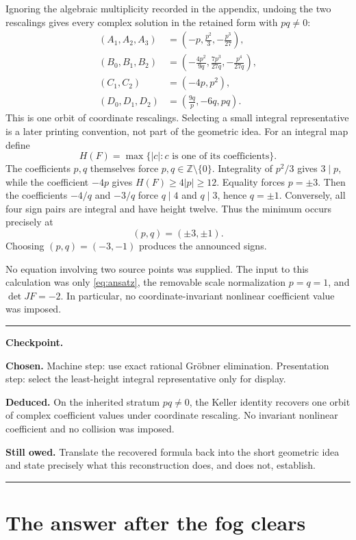 \documentclass[11pt,a4paper]{article}
\numberwithin{equation}{section}
\theoremstyle{definition}
\theoremstyle{remark}
\newenvironment{modelanswer}
  {\par\smallskip\noindent{\color{modelgreen}\bfseries MODEL}\par\smallskip}
  {\par\medskip}
\newenvironment{checkpoint}
  {\par\smallskip\noindent\color{paperblue}\hrule\color{black}
   \vspace{0.55em}\noindent\begin{minipage}{\linewidth}\small
   \textbf{Checkpoint.}\par\smallskip}
  {\end{minipage}\vspace{0.45em}\color{paperblue}\hrule\color{black}
   \par\medskip}
\newcommand{\chosen}[1]{\textbf{Chosen.} #1\par\smallskip}
\newcommand{\deduced}[1]{\textbf{Deduced.} #1\par\smallskip}
\newcommand{\owed}[1]{\textbf{Still owed.} #1}
\begin{document}
\begin{modelanswer}
Ignoring the algebraic multiplicity recorded in the appendix, undoing the two
rescalings gives every complex solution in the retained form with
\(pq\ne0\):
\begin{equation}\label{eq:family}
\begin{aligned}
(A_1,A_2,A_3)&=\left(-p,\frac{p^2}{3},-\frac{p^3}{27}\right),\\
(B_0,B_1,B_2)&=\left(-\frac{4p^2}{9q},\frac{7p^3}{27q},
  -\frac{p^4}{27q}\right),\\
(C_1,C_2)&=(-4p,p^2),\\
(D_0,D_1,D_2)&=\left(\frac{9q}{p},-6q,pq\right).
\end{aligned}
\end{equation}
This is one orbit of coordinate rescalings.  Selecting a
small integral representative is a later printing convention, not part of
the geometric idea.  For an integral map define
\[
 H(F)=\max\{|c|:c\text{ is one of its coefficients}\}.
\]
The coefficients \(p,q\) themselves force
\(p,q\in\mathbb Z\setminus\{0\}\).  Integrality of \(p^2/3\) gives
\(3\mid p\), while the coefficient \(-4p\) gives
\(H(F)\ge4|p|\ge12\).  Equality forces \(p=\pm3\).  Then the coefficients
\(-4/q\) and \(-3/q\) force \(q\mid4\) and \(q\mid3\), hence \(q=\pm1\).
Conversely, all four sign pairs are integral and have height twelve.  Thus
the minimum occurs precisely at
\[
  (p,q)=(\pm3,\pm1).
\]
Choosing \((p,q)=(-3,-1)\) produces the announced signs.

No equation involving two source points was supplied.  The input to this
calculation was only \eqref{eq:ansatz}, the removable scale normalization
\(p=q=1\), and \(\det JF=-2\).  In particular, no coordinate-invariant
nonlinear coefficient value was imposed.
\end{modelanswer}

\begin{checkpoint}
\chosen{Machine step: use exact rational Gr\"obner elimination.  Presentation
step: select the least-height integral representative only for display.}
\deduced{On the inherited stratum \(pq\ne0\), the Keller identity recovers one
orbit of complex coefficient values under coordinate rescaling.  No invariant
nonlinear coefficient and no collision was imposed.}
\owed{Translate the recovered formula back into the short geometric idea and
state precisely what this reconstruction does, and does not, establish.}
\end{checkpoint}

\section{The answer after the fog clears}
\end{document}
